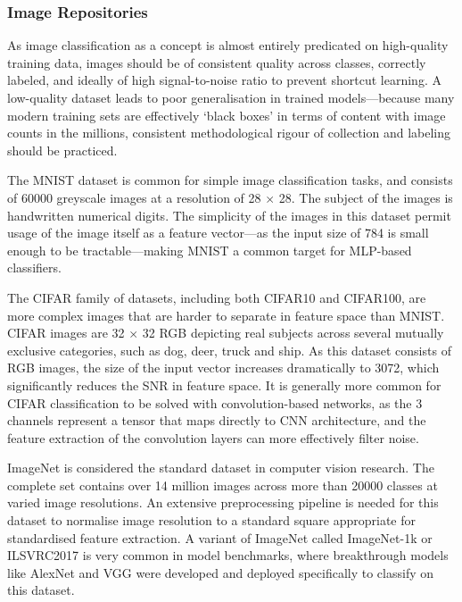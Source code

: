 \documentclass[10pt, a4paper]{article}
\begin{document}
\subsubsection{Image Repositories}
As image classification as a concept is almost entirely predicated on high-quality training data, images should be of consistent quality across classes, correctly labeled, and ideally of high signal-to-noise ratio to prevent shortcut learning\cite{geirhos_shortcut_2020}. A low-quality dataset leads to poor generalisation in trained models---because many modern training sets are effectively `black boxes' in terms of content with image counts in the millions, consistent methodological rigour of collection and labeling should be practiced. 

The MNIST dataset is common for simple image classification tasks, and consists of 60000 greyscale images at a resolution of 28 $\times$ 28\cite{lecun_gradient-based_1998}. The subject of the images is handwritten numerical digits. The simplicity of the images in this dataset permit usage of the image itself as a feature vector---as the input size of 784 is small enough to be tractable---making MNIST a common target for MLP-based classifiers.

The CIFAR family of datasets, including both CIFAR10 and CIFAR100, are more complex images that are harder to separate in feature space than MNIST. CIFAR images are 32 $\times$ 32 RGB depicting real subjects across several mutually exclusive categories, such as dog, deer, truck and ship\cite{krizhevsky_learning_2009}. As this dataset consists of RGB images, the size of the input vector increases dramatically to 3072, which significantly reduces the SNR in feature space. It is generally more common for CIFAR classification to be solved with convolution-based networks, as the 3 channels represent a tensor that maps directly to CNN architecture, and the feature extraction of the convolution layers can more effectively filter noise.

ImageNet is considered the standard dataset in computer vision research. The complete set contains over 14 million images across more than 20000 classes at varied image resolutions\cite{deng_imagenet_2009}. An extensive preprocessing pipeline is needed for this dataset to normalise image resolution to a standard square appropriate for standardised feature extraction. A variant of ImageNet called ImageNet-1k or ILSVRC2017 is very common in model benchmarks, where breakthrough models like AlexNet and VGG were developed and deployed specifically to classify on this dataset\cite{krizhevsky_imagenet_2017}.
\end{document}
